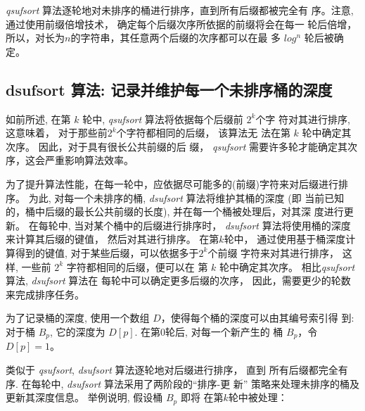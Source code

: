 \documentclass{ws-ijprai}
\begin{document}
\emph{qsufsort} 算法逐轮地对未排序的桶进行排序，直到所有后缀都被完全有
序。注意, 通过使用前缀倍增技术， 确定每个后缀次序所依据的前缀将会在每一
轮后倍增，所以，对长为$n$的字符串，其任意两个后缀的次序都可以在最
多 $log^n$ 轮后被确定。

\subsection{dsufsort 算法: 记录并维护每一个未排序桶的深度}
\label{sec:dsufsort}

如前所述, 在第 $k$ 轮中, \emph{qsufsort} 算法将依据每个后缀前 $2^k$个字
符对其进行排序, 这意味着， 对于那些前$2^k$个字符都相同的后缀， 该算法无
法在第 $k$ 轮中确定其次序。 因此，对于具有很长公共前缀的后
缀， \emph{qsufsort} 需要许多轮才能确定其次序，这会严重影响算法效率。

为了提升算法性能，在每一轮中，应依据尽可能多的(前缀)字符来对后缀进行排
序。 为此, 对每一个未排序的桶, \emph{dsufsort} 算法将维护其桶的深度 (即
当前已知的，桶中后缀的最长公共前缀的长度), 并在每一个桶被处理后，对其深
度进行更新。 在每轮中, 当对某个桶中的后缀进行排序时， \emph{dsufsort}
算法将使用桶的深度来计算其后缀的键值， 然后对其进行排序。 在第$k$轮中，
通过使用基于桶深度计算得到的键值, 对于某些后缀，可以依据多于$2^k$个前缀
字符来对其进行排序， 这样, 一些前 $2^k$ 字符都相同的后缀，便可以在
第 $k$ 轮中确定其次序。 相比\emph{qsufsort}算法, \emph{dsufsort} 算法在
每轮中可以确定更多后缀的次序， 因此，需要更少的轮数来完成排序任务。

为了记录桶的深度, 使用一个数组 $D$，使得每个桶的深度可以由其编号索引得
到: 对于桶 $B_p$, 它的深度为 $D[p]$. 在第0轮后, 对每一个新产生的
桶 $B_p$，令 $D[p] = 1$。

类似于 \emph{qsufsort}, \emph{dsufsort} 算法逐轮地对后缀进行排序， 直到
所有后缀都完全有序. 在每轮中, \emph{dsufsort} 算法采用了两阶段的“排序-更
新” 策略来处理未排序的桶及更新其深度信息。 举例说明, 假设桶 $B_p$ 即将
在第$k$轮中被处理：
\end{document}
